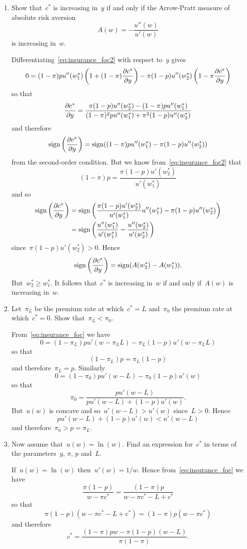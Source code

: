 \begin{enumerate}
\begin{enumerate}
		\item
		Show that~$c^*$ is increasing in~$y$ if and only if the Arrow-Pratt measure of absolute risk aversion
		\[ A(w)=-\frac{u''(w)}{u'(w)} \]
		is increasing in~$w$.
		\begin{solution}
			Differentiating~\eqref{eq:insurance_foc2} with respect to~$y$ gives
			\[ 0=(1-\pi)pu''(w_1^*)\left(1+(1-\pi)\frac{\partial c^*}{\partial y}\right)-\pi(1-p)u''(w_2^*)\left(1-\pi\frac{\partial c^*}{\partial y}\right) \]
			so that
			\[ \frac{\partial c^*}{\partial y}=\frac{\pi(1-p)u''(w_2^*)-(1-\pi)pu''(w_1^*)}{(1-\pi)^2pu''(w_1^*)+\pi^2(1-p)u''(w_2^*)}\]
			and therefore
			\[ \operatorname{sign}\left(\frac{\partial c^*}{\partial y}\right)=\operatorname{sign}((1-\pi)pu''(w_1^*)-\pi(1-p)u''(w_2^*)) \]
			from the second-order condition.
			But we know from~\eqref{eq:insurance_foc2} that
			\[ (1-\pi)p=\frac{\pi(1-p)u'(w_2^*)}{u'(w_1^*)} \]
			and so
			\begin{align}
				\operatorname{sign}\left(\frac{\partial c^*}{\partial y}\right)
				&= \operatorname{sign}\left(\frac{\pi(1-p)u'(w_2^*)}{u'(w_1^*)}u''(w_1^*)-\pi(1-p)u''(w_2^*)\right)\\
				&= \operatorname{sign}\left(\frac{u''(w_1^*)}{u'(w_1^*)}-\frac{u''(w_2^*)}{u'(w_2^*)}\right)
			\end{align}
			since~$\pi(1-p)u'(w_2^*)>0$.
			Hence
			\[ \operatorname{sign}\left(\frac{\partial c^*}{\partial y}\right)=\operatorname{sign}(A(w_2^*)-A(w_1^*)). \]
			But~$w_2^*\ge w_1^*$.
			It follows that~$c^*$ is increasing in~$w$ if and only if~$A(w)$ is increasing in~$w$.
		\end{solution}

		\item
		Let~$\pi_L$ be the premium rate at which~$c^*=L$ and~$\pi_0$ the premium rate at which~$c^*=0$.
		Show that~$\pi_L<\pi_0$.
		\begin{solution}
			From~\eqref{eq:insurance_foc} we have
			\[ 0=(1-\pi_L)pu'(w-\pi_L L)-\pi_L(1-p)u'(w-\pi_L L) \]
			so that
			\[ (1-\pi_L)p=\pi_L(1-p) \]
			and therefore~$\pi_L=p$.
			Similarly
			\[ 0=(1-\pi_0)pu'(w-L)-\pi_0(1-p)u'(w) \]
			so that
			\[ \pi_0=\frac{pu'(w-L)}{pu'(w-L)+(1-p)u'(w)}. \]
			But~$u(w)$ is concave and so~$u'(w-L)>u'(w)$ since~$L>0$.
			Hence
			\[ pu'(w-L)+(1-p)u'(w)<u'(w-L) \]
			and therefore~$\pi_0>p=\pi_L$.
		\end{solution}

		\item
		Now assume that~$u(w)=\ln(w)$.
		Find an expression for~$c^*$ in terms of the parameters~$y$, $\pi$, $p$ and~$L$.
		\begin{solution}
			If~$u(w)=\ln(w)$ then~$u'(w)=1/w$.
			Hence from~\eqref{eq:insurance_foc} we have
			\[ \frac{\pi(1-p)}{w-\pi c^*}=\frac{(1-\pi)p}{w-\pi c^*-L+c^*} \]
			so that
			\[ \pi(1-p)(w-\pi c^*-L+c^*)=(1-\pi)p(w-\pi c^*) \]
			and therefore
			\[ c^*=\frac{(1-\pi)pw-\pi(1-p)(w-L)}{\pi(1-\pi)}. \]
		\end{solution}


\end{enumerate}
\end{enumerate}
